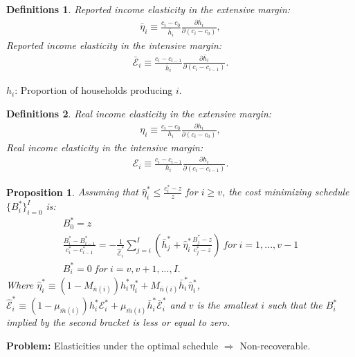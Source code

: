 \documentclass[xcolor=pdftex,dvipsnames,table]{beamer}
\newtheorem{prop}{Proposition}
\newtheorem{defin}{Definitions}
\begin{document}
\begin{frame}[label=elasticities]
\begin{defin}
	Reported income elasticity in the extensive margin:
	\begin{align*}
	\bar{\eta}_i \equiv \frac{c_i-c_0}{\bar{h}_i}\frac{\partial \bar{h}_i}{\partial (c_i-c_0)},
\end{align*}
Reported income elasticity in the intensive margin:
\begin{align*}
	\bar{\mathcal{E}}_i \equiv \frac{c_i-c_{i-1}}{\bar{h}_i}\frac{\partial \bar{h}_i}{\partial (c_i-c_{i-1})}.
\end{align*}
\end{defin}
\end{frame}

\begin{frame}
$h_i$: Proportion of households producing $i$.
\pause
\begin{defin}
	Real income elasticity in the extensive margin:
	\begin{align*}
	\eta_i \equiv \frac{c_i-c_0}{h_i}\frac{\partial h_i}{\partial (c_i-c_0)},
\end{align*}
Real income elasticity in the intensive margin:
\begin{align*}
	\mathcal{E}_i \equiv \frac{c_i-c_{i-1}}{h_i}\frac{\partial h_i}{\partial (c_i-c_{i-1})}.
\end{align*}
\end{defin}
\hyperlink{implications}{}
\end{frame}

\begin{frame}[label=prop_imp]
\begin{prop}
	\label{prop_imp_tra}
	Assuming that $\hat{\eta}^{*}_i\leq \frac{c^*_i-z}{z}$ for $i\geq v$, the cost minimizing schedule $\{B^*_i\}_{i=0}^I$ is: 
	\begin{align*}
	B_0^* = z \nonumber\\		
	\frac{B_i^*-B_{i-1}^*}{c^*_i-c^*_{i-1}}=-\frac{1}{\hat{\mathcal{E}}^*_i}\sum_{j=i}^{I}\left(\bar{h}^*_j+\hat{\eta}^*_i\frac{B_j^*-z}{c^*_j-z}\right)\	 for\ i =1,...,v-1  \nonumber\\
	B^*_i = 0\ for\ i = v, v+1, ...,I. \nonumber
	\end{align*}
	Where $\hat{\eta}^*_i\equiv(1-M_{\bar{n}(i)})h^*_i\eta^{*}_i+M_{\bar{n}(i)}\bar{h}^*_i\bar{\eta}^*_i$, 
	$\hat{\mathcal{E}}^*_i\equiv(1-\mu_{\bar{m}(i)})h^*_i\mathcal{E}^{*}_i+\mu_{\bar{m}(i)}\bar{h}^*_i\bar{\mathcal{E}}^*_i$ and $v$ is the smallest $i$ such that the $B^*_i$ implied by the second bracket is less or equal to zero. 
\end{prop}
\hyperlink{implications}{}
\hyperlink{proof_main}{}
\hyperlink{lemma}{}
\hyperlink{welfare}{}
\hyperlink{efficiency}{}
\begin{block}

\textbf{Problem:} Elasticities under the optimal schedule $\Rightarrow$ Non-recoverable.
\end{block}
\end{frame}
\end{document}

